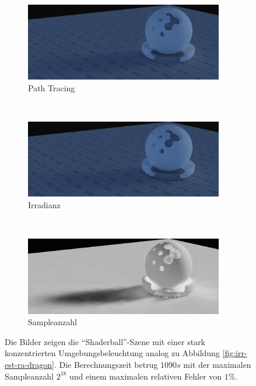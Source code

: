 		\begin{figure}[h]
			\begin{subfigure}[t]{\textwidth}
				\center
				\includegraphics[width=0.95\textwidth]{pic/irr_est-ra-shaderball3-ref.png}
				\caption{Path Tracing}
			\end{subfigure}
			\medskip \\
			\begin{subfigure}[t]{\textwidth}
				\center
				\includegraphics[width=0.95\textwidth]{pic/irr_est-ra-shaderball3-irr.png}
				\caption{Irradianz}
			\end{subfigure}
			\medskip \\
			\begin{subfigure}[t]{\textwidth}
				\center
				\includegraphics[width=0.95\textwidth]{pic/irr_est-ra-shaderball3-scount.png}
				\caption{Sampleanzahl}
			\end{subfigure}
			\caption[Dritte adaptive Vertex-Irradiance-Map anhand der \enquote{Shaderball}-Szene]{Die Bilder zeigen die \enquote{Shaderball}-Szene mit einer stark konzentrierten Umgebungsbeleuchtung analog zu Abbildung \ref{fig:irr-est-ra-dragon}. Die Berechnungszeit betrug $1090\unit{s}$ mit der maximalen Sampleanzahl $2^{18}$ und einem maximalen relativen Fehler von $1\unit{\%}$.}
			\label{fig:irr-est-ra-shaderball3}
		\end{figure}


